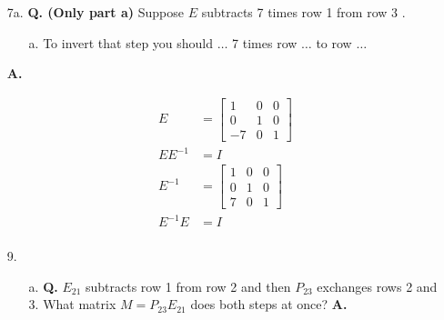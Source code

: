 \documentclass[main.tex]{subfiles}
\begin{document}
\begin{enumerate}
        \item [7a.] \textbf{Q. (Only part a)} Suppose $E$ subtracts 7 times row 1 from row 3 .
            \begin{enumerate}
                \item [a.] To invert that step you should $\ldots$ 7 times row $\ldots$ to row $\ldots$
            \end{enumerate}
            \textbf{A.}
            
            $$
            \begin{aligned}
            E & =\left[\begin{array}{ccc}
            1 & 0 & 0 \\
            0 & 1 & 0 \\
            -7 & 0 & 1
            \end{array}\right] \\
            E E^{-1} & = I \\
            E^{-1} & =\left[\begin{array}{lll}
            1 & 0 & 0 \\
            0 & 1 & 0 \\
            7 & 0 & 1
            \end{array}\right] \\
            E^{-1} E & = I \\
            \end{aligned}
            $$
            
        \item [9.] 
        \begin{enumerate}
            \item [a.] \textbf{Q.}  $E_{21}$ subtracts row 1 from row 2 and then $P_{23}$ exchanges rows 2 and 3. What matrix $M=P_{23} E_{21}$ does both steps at once? \textbf{A.}
            

\end{enumerate}
\end{enumerate}
\end{document}

